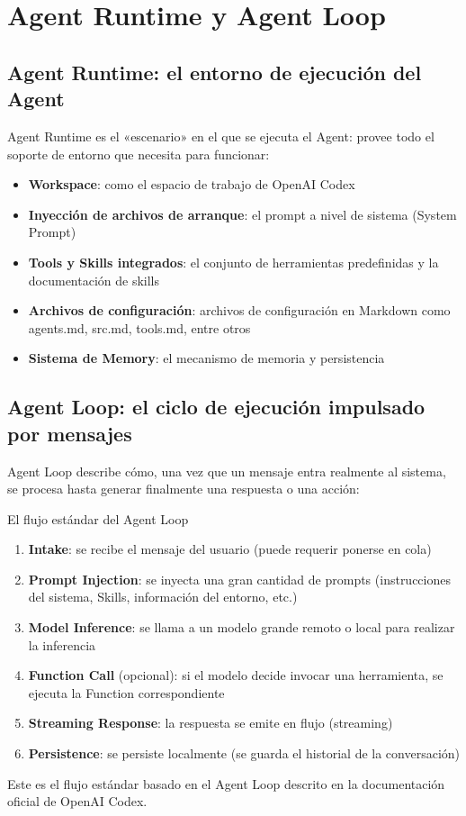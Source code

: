 \section{Agent Runtime y Agent Loop}

\subsection{Agent Runtime: el entorno de ejecución del Agent}

Agent Runtime es el «escenario» en el que se ejecuta el Agent: provee todo el soporte de entorno que necesita para funcionar:

\begin{itemize}
    \item \textbf{Workspace}: como el espacio de trabajo de OpenAI Codex
    \item \textbf{Inyección de archivos de arranque}: el prompt a nivel de sistema (System Prompt)
    \item \textbf{Tools y Skills integrados}: el conjunto de herramientas predefinidas y la documentación de skills
    \item \textbf{Archivos de configuración}: archivos de configuración en Markdown como agents.md, src.md, tools.md, entre otros
    \item \textbf{Sistema de Memory}: el mecanismo de memoria y persistencia
\end{itemize}

\subsection{Agent Loop: el ciclo de ejecución impulsado por mensajes}

Agent Loop describe cómo, una vez que un mensaje entra realmente al sistema, se procesa hasta generar finalmente una respuesta o una acción:

\begin{importantbox}{El flujo estándar del Agent Loop}
\begin{enumerate}
    \item \textbf{Intake}: se recibe el mensaje del usuario (puede requerir ponerse en cola)
    \item \textbf{Prompt Injection}: se inyecta una gran cantidad de prompts (instrucciones del sistema, Skills, información del entorno, etc.)
    \item \textbf{Model Inference}: se llama a un modelo grande remoto o local para realizar la inferencia
    \item \textbf{Function Call} (opcional): si el modelo decide invocar una herramienta, se ejecuta la Function correspondiente
    \item \textbf{Streaming Response}: la respuesta se emite en flujo (streaming)
    \item \textbf{Persistence}: se persiste localmente (se guarda el historial de la conversación)
\end{enumerate}
Este es el flujo estándar basado en el Agent Loop descrito en la documentación oficial de OpenAI Codex.
\end{importantbox}


